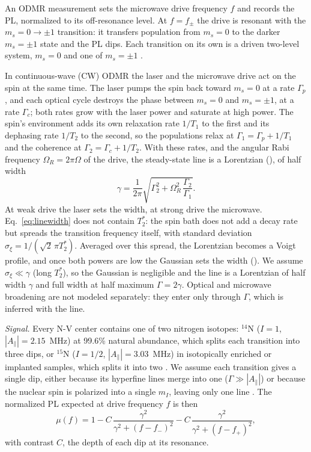 An ODMR measurement sets the microwave drive frequency $f$ and records the PL, normalized to its off-resonance
level. At $f=f_\pm$ the drive is resonant with the $m_s=0\to\pm1$ transition: it transfers population from
$m_s=0$ to the darker $m_s=\pm1$ state and the PL dips. Each transition on its own is a driven two-level system,
$m_s=0$ and one of $m_s=\pm1$ \cite{dreau2011}.

In continuous-wave (CW) ODMR the laser and the microwave drive act on the spin at the same time. The laser pumps the
spin back toward $m_s=0$ at a rate $\Gamma_p$, and each optical cycle destroys the phase between $m_s=0$ and
$m_s=\pm1$, at a rate $\Gamma_c$; both rates grow with the laser power and saturate at high power. The spin's
environment adds its own relaxation rate $1/T_1$ to the first and its dephasing rate $1/T_2$ to the second, so the
populations relax at $\Gamma_1=\Gamma_p+1/T_1$ and the coherence at $\Gamma_2=\Gamma_c+1/T_2$. With these rates, and
the angular Rabi frequency $\Omega_R=2\pi\Omega$ of the drive, the steady-state line is a Lorentzian
(), of half width \cite{dreau2011}
    \begin{equation}
      \gamma=\frac{1}{2\pi}\sqrt{\Gamma_2^2+\Omega_R^2\,\frac{\Gamma_2}{\Gamma_1}} .
      \label{eq:linewidth}
    \end{equation}
At weak drive the laser sets the width, at strong drive
the microwave. Eq.~\eqref{eq:linewidth} does not contain $T_2^*$: the spin bath does not add a decay rate but
spreads the transition frequency itself, with standard deviation $\sigma_\xi=1/(\sqrt2\,\pi T_2^*)$. Averaged over
this spread, the Lorentzian becomes a Voigt profile, and once both powers are low the Gaussian sets the width
(). We assume $\sigma_\xi\ll\gamma$ (long $T_2^*$), so the Gaussian is negligible and the line is a Lorentzian
of half width $\gamma$ and full width at half maximum $\Gamma=2\gamma$.
Optical and microwave broadening are not modeled separately: they enter only
through $\Gamma$, which is inferred with the line.

\emph{Signal.} Every N-V center contains one of two nitrogen isotopes: $^{14}$N ($I=1$,
$|A_\parallel|=2.15$~MHz) at 99.6\% natural abundance, which splits each transition into three dips, or $^{15}$N
($I=1/2$, $|A_\parallel|=3.03$~MHz) in isotopically enriched or implanted samples, which splits it into two
\cite{felton2009}. We assume each transition gives a single dip, either because its hyperfine lines merge into one
($\Gamma\gg|A_\parallel|$) or because the nuclear spin is polarized into a single $m_I$, leaving only one line
\cite{jacques2009}. The normalized PL expected at drive frequency $f$ is then
\begin{equation}
  \mu(f)=1-C\,\frac{\gamma^2}{\gamma^2+(f-f_-)^2}-C\,\frac{\gamma^2}{\gamma^2+(f-f_+)^2},
  \label{eq:signal-both}
\end{equation}
with contrast $C$, the depth of each dip at its resonance.

